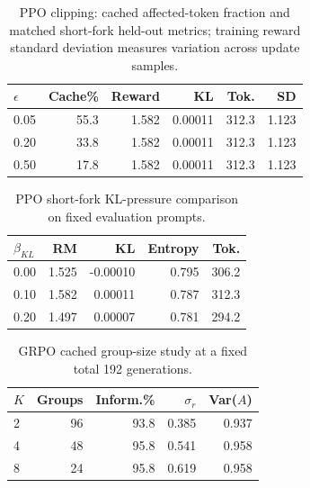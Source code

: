 \begin{table}[!htbp]
\centering
\caption{PPO clipping: cached affected-token fraction and matched short-fork held-out metrics; training reward standard deviation measures variation across update samples.}
\label{tab:ppo-clip}
\scriptsize
\setlength{\tabcolsep}{3.4pt}
\begin{tabular}{lrrrrr}
\toprule
$\epsilon$ & Cache\% & Reward & KL & Tok. & SD \\
\midrule
0.05 & 55.3 & 1.582 & 0.00011 & 312.3 & 1.123 \\
0.20 & 33.8 & 1.582 & 0.00011 & 312.3 & 1.123 \\
0.50 & 17.8 & 1.582 & 0.00011 & 312.3 & 1.123 \\
\bottomrule
\end{tabular}
\end{table}

\begin{table}[!htbp]
\centering
\caption{PPO short-fork KL-pressure comparison on fixed evaluation prompts.}
\label{tab:ppo-kl}
\scriptsize
\setlength{\tabcolsep}{3.4pt}
\begin{tabular}{lrrrr}
\toprule
$\beta_{KL}$ & RM & KL & Entropy & Tok. \\
\midrule
0.00 & 1.525 & -0.00010 & 0.795 & 306.2 \\
0.10 & 1.582 & 0.00011 & 0.787 & 312.3 \\
0.20 & 1.497 & 0.00007 & 0.781 & 294.2 \\
\bottomrule
\end{tabular}
\end{table}

\begin{table}[!htbp]
\centering
\caption{GRPO cached group-size study at a fixed total 192 generations.}
\label{tab:grpo-groups}
\scriptsize
\setlength{\tabcolsep}{3.4pt}
\begin{tabular}{lrrrr}
\toprule
$K$ & Groups & Inform.\% & $\sigma_r$ & Var($A$) \\
\midrule
2 & 96 & 93.8 & 0.385 & 0.937 \\
4 & 48 & 95.8 & 0.541 & 0.958 \\
8 & 24 & 95.8 & 0.619 & 0.958 \\
\bottomrule
\end{tabular}
\end{table}

